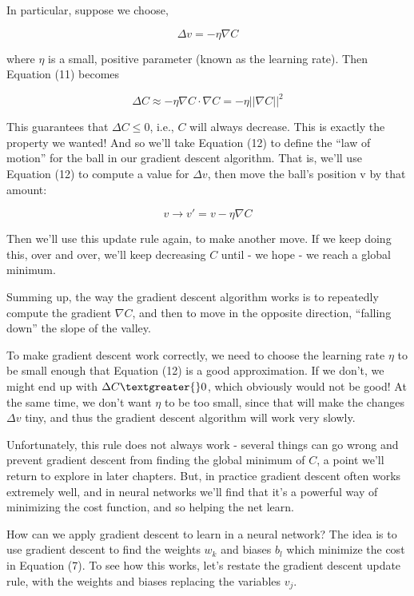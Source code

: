 \documentclass[12 pt]{article}
\begin{document}
In particular, suppose we choose,

\begin{equation}
    \Delta v = −\eta \nabla C
\end{equation}

where $ \eta $ is a small, positive parameter (known as the learning
rate). Then Equation (11) becomes

\begin{equation}
     \Delta C \approx −\eta \nabla C \cdot \nabla C = −\eta || \nabla C|| ^
     2
\end{equation}

This guarantees that $ \Delta C \leq 0 $, i.e., $ C $ will always
decrease. This is exactly the property we wanted! And so we'll take
Equation (12) to define the ``law of motion'' for the ball in our
gradient descent algorithm. That is, we'll use Equation (12) to compute
a value for $ \Delta v $, then move the ball's position v by that
amount:

\begin{equation}
    v \to v' = v − \eta \nabla C
\end{equation}

Then we'll use this update rule again, to make another move. If we keep
doing this, over and over, we'll keep decreasing $ C $ until - we hope
- we reach a global minimum.

Summing up, the way the gradient descent algorithm works is to
repeatedly compute the gradient $ \nabla C $, and then to move in the
opposite direction, ``falling down'' the slope of the valley.

To make gradient descent work correctly, we need to choose the learning
rate $ \eta $ to be small enough that Equation (12) is a good
approximation. If we don't, we might end up with $ \Delta C
\textgreater{} 0 $, which obviously would not be good!
At the same time, we don't want $ \eta $ to be too small,
since that will make the changes $ \Delta v $ tiny,
and thus the gradient descent algorithm will work very slowly.

Unfortunately, this rule does not always work - several things can go
wrong and prevent gradient descent from finding the global minimum of
$ C $, a point we'll return to explore in later chapters. But, in
practice gradient descent often works extremely well, and in neural
networks we'll find that it's a powerful way of minimizing the cost
function, and so helping the net learn.

How can we apply gradient descent to learn in a neural network? The idea
is to use gradient descent to find the weights $ w_k $ and biases
$ b_l $ which minimize the cost in Equation (7). To see how this works,
let's restate the gradient descent update rule, with the weights and
biases replacing the variables $ v_j $.
\end{document}
